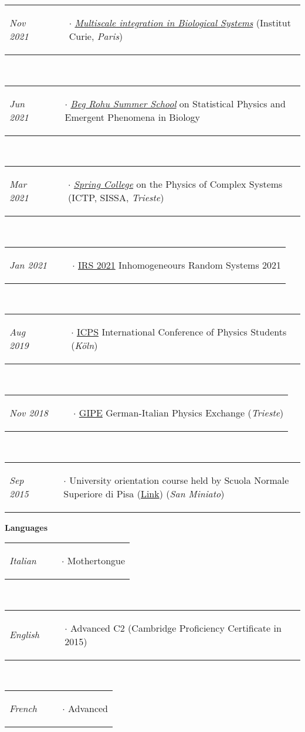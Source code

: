 \documentclass{scrartcl}
\newcommand{\NewItemEntry}[2]{
  \noindent
  \begin{tabular}[r]{p{2.5cm} p{14.0cm}}
    \-\hspace{0.5cm} \small \textit{#1}
    &
    \begin{itemize}
      \vspace{-0.65cm}
      \item[$\cdot$] #2
    \end{itemize}
  \end{tabular}
  \vspace{-0.2cm}
}
\begin{document}
\begin{cv}{}
{\NewItemEntry{Nov 2021}{\textit{\href{https://training.institut-curie.org/courses/multiscale-integration-in-biological-systems-3}{Multiscale integration in Biological Systems}} (Institut Curie, \textit{Paris})}\\
\NewItemEntry{Jun 2021}{\textit{\href{https://www.ipht.fr/Meetings/BegRohu2021/index.html}{Beg Rohu Summer School}} on Statistical Physics and Emergent Phenomena in Biology} \\
\NewItemEntry{Mar 2021}{\textit{\href{http://indico.ictp.it/event/9442/}{Spring College}} on the Physics of Complex Systems (ICTP, SISSA, \textit{Trieste})}\\
\NewItemEntry{Jan 2021}{\href{http://irs.math.cnrs.fr/2021/}{IRS 2021} Inhomogeneours Random Systems 2021}\\
\NewItemEntry{Aug 2019}{\href{https://www.iaps.info/icps/previous-icpss/icps-2019-in-germany/}{ICPS} International Conference of Physics Students (\textit{Köln})}\\
\NewItemEntry{Nov 2018}{\href{http://ai-sf.it/gipe18/}{GIPE} German-Italian Physics Exchange (\textit{Trieste})}\\
\NewItemEntry{Sep 2015}{University orientation course held by Scuola Normale Superiore di Pisa (\href{https://www.sns.it/it/orientamento}{Link}) (\textit{San Miniato})}

\vspace{1em}
}\fi


\normalsize

\textcolor{carmine}{\textbf{Languages}}
\vspace{1em}

\small
\NewItemEntry{Italian}{Mothertongue}\\[\v]
\NewItemEntry{English}{Advanced C2 (Cambridge Proficiency Certificate in 2015)}\\[\v]
\NewItemEntry{French}{Advanced}\\[\v]

\date{}
\end{cv}
\end{document}
